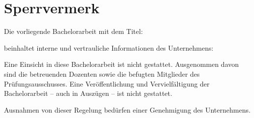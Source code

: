 \section*{Sperrvermerk}
\vspace*{0.7cm}

Die vorliegende Bachelorarbeit mit dem Titel:
\vspace*{0.7cm}

\titel


\vspace*{0.7cm}
beinhaltet interne und vertrauliche Informationen des Unternehmens:
\vspace*{0.7cm}

\institutioneins

\vspace*{0.7cm}
Eine Einsicht in diese Bachelorarbeit ist nicht gestattet. Ausgenommen davon sind die betreuenden Dozenten sowie die befugten Mitglieder des Prüfungsausschusses. Eine Veröffentlichung und Vervielfältigung der Bachelorarbeit – auch in Auszügen – ist nicht gestattet.

\vspace*{0.7cm}

Ausnahmen von dieser Regelung bedürfen einer Genehmigung des Unternehmens.

\clearpage
\rohead{\textnormal{\headmark}}